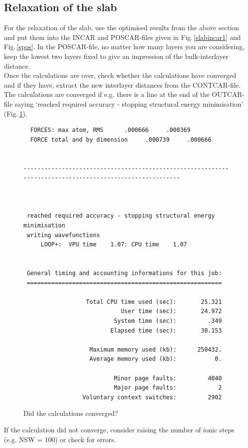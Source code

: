 \documentclass[11pt,oneside,a4paper, captions=nooneline, headsepline]{article}%
\begin{document}
\subsection{Relaxation of the slab}
For the relaxation of the slab, use the optimised results from the above section and put them into the INCAR and POSCAR-files given in Fig.\,\ref{slabincar1} and Fig.\,\ref{spos}. In the POSCAR-file, no matter how many layers you are considering, keep the lowest two layers fixed to give an impression of the bulk-interlayer distance.\\
Once the calculations are over, check whether the calculations have converged and if they have, extract the new interlayer distances from the CONTCAR-file. The calculations are converged if e.g. there is a line at the end of the OUTCAR-file saying `reached required accuracy - stopping structural energy minimisation' (Fig.\,\ref{sconv}).
\begin{figure}[h!!]
\begin{verbatim}
  FORCES: max atom, RMS      .000666     .000369
  FORCE total and by dimension     .000739     .000666


--------------------------------------------------------------------------------------------------------



 reached required accuracy - stopping structural energy minimisation
 writing wavefunctions
     LOOP+:  VPU time    1.07: CPU time    1.07


 General timing and accounting informations for this job:
 ========================================================

                  Total CPU time used (sec):       25.321
                            User time (sec):       24.972
                          System time (sec):         .349
                         Elapsed time (sec):       30.153

                   Maximum memory used (kb):      250432.
                   Average memory used (kb):           0.

                          Minor page faults:         4040
                          Major page faults:            2
                 Voluntary context switches:         2902                                                 
\end{verbatim}
\caption{Did the calculations converged?}
\label{sconv}
\end{figure}
If the calculation did not converge, consider raising the number of ionic steps (e.g. NSW = 100) or check for errors.\\
\end{document}
